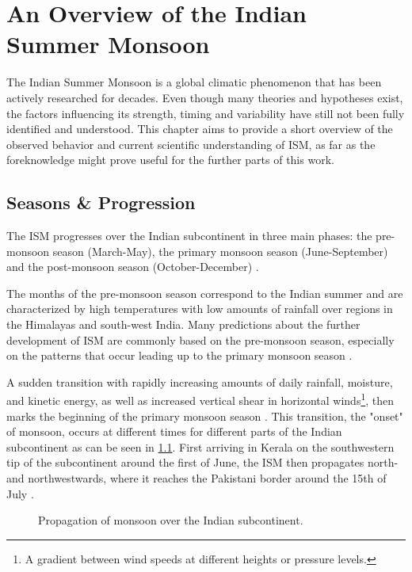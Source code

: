 \chapter{An Overview of the Indian Summer Monsoon}
\label{c:ism_overview}
The Indian Summer Monsoon is a global climatic phenomenon that has been actively researched for decades. Even though many theories and hypotheses exist, the factors influencing its strength, timing and variability have still not been fully identified and understood. This chapter aims to provide a short overview of the observed behavior and current scientific understanding of ISM, as far as the foreknowledge might prove useful for the further parts of this work.

\section{Seasons \& Progression}
\label{st:ism_seasons}
The ISM progresses over the Indian subcontinent in three main phases: the pre-monsoon season (March-May), the primary monsoon season (June-September) and the post-monsoon season (October-December) \citep{Stolbova.2015}.

The months of the pre-monsoon season correspond to the Indian summer and are characterized by high temperatures with low amounts of rainfall over regions in the Himalayas and south-west India. Many predictions about the further development of ISM are commonly based on the pre-monsoon season, especially on the patterns that occur leading up to the primary monsoon season \citep{Stolbova.2015}.

A sudden transition with rapidly increasing amounts of daily rainfall, moisture, and kinetic energy, as well as increased vertical shear in horizontal winds\footnote{A gradient between wind speeds at different heights or pressure levels.}, then marks the beginning of the primary monsoon season \citep{Pradhan.2017}. This transition, the "onset" of monsoon, occurs at different times for different parts of the Indian subcontinent as can be seen in \cref{fig:onset_propagation}. First arriving in Kerala on the southwestern tip of the subcontinent around the first of June, the ISM then propagates north- and northwestwards, where it reaches the Pakistani border around the 15th of July \citep{Willetts.2017}.

\begin{figure}[h]
  \caption{Propagation of monsoon over the Indian subcontinent.}
  \label{fig:onset_propagation}
\end{figure}

